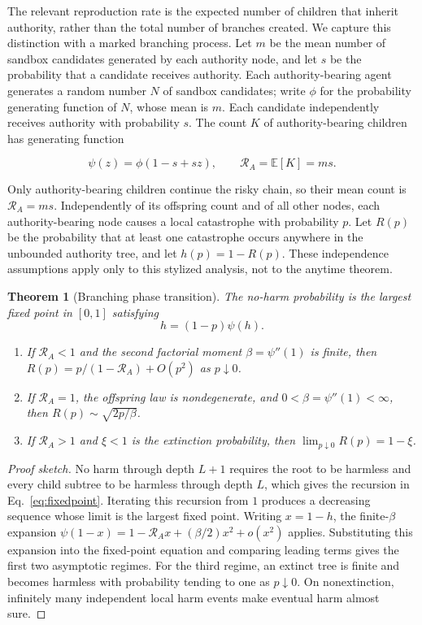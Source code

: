 \documentclass[sigconf,nonacm]{acmart}
\newtheorem{theorem}{Theorem}
\newcommand{\E}{\mathbb{E}}
\newcommand{\RA}{\mathcal{R}_{\!A}}
\begin{document}
The relevant reproduction rate is the expected number of children that inherit authority, rather
than the total number of branches created.  We capture this distinction with a marked branching process.  Let $m$ be
the mean number of sandbox candidates generated by each authority node, and let $s$ be the
probability that a candidate receives authority.  Each authority-bearing agent generates a
random number $N$ of sandbox candidates; write $\phi$ for the probability generating function of
$N$, whose mean is $m$.  Each candidate independently receives authority with probability $s$.
The count $K$ of authority-bearing children has generating function

\[
 \psi(z)=\phi(1-s+sz),\qquad \RA=\E[K]=ms.
\]

Only authority-bearing children continue the risky chain, so their mean count is
$\RA=ms$.  Independently of its offspring count and of all other nodes, each authority-bearing
node causes a local catastrophe with probability $p$.  Let $R(p)$ be the probability that at least one catastrophe occurs anywhere in
the unbounded authority tree, and let $h(p)=1-R(p)$.  These independence assumptions apply only to
this stylized analysis, not to the anytime theorem.

\begin{theorem}[Branching phase transition]
The no-harm probability is the largest fixed point in $[0,1]$ satisfying
\begin{equation}
 h=(1-p)\psi(h).
 \label{eq:fixedpoint}
\end{equation}
\begin{enumerate}
 \item If $\RA<1$ and the second factorial moment $\beta=\psi''(1)$ is finite, then
 $R(p)=p/(1-\RA)+O(p^2)$ as $p\downarrow0$.
 \item If $\RA=1$, the offspring law is nondegenerate, and
 $0<\beta=\psi''(1)<\infty$, then
 $R(p)\sim\sqrt{2p/\beta}$.
 \item If $\RA>1$ and $\xi<1$ is the extinction probability, then
 $\lim_{p\downarrow0}R(p)=1-\xi$.
\end{enumerate}
\end{theorem}

\begin{proof}[Proof sketch]
No harm through depth $L+1$ requires the root to be harmless and every child subtree to be
harmless through depth $L$, which gives the recursion in Eq.~\eqref{eq:fixedpoint}.  Iterating this
recursion from $1$ produces a decreasing sequence whose limit is the largest fixed point.  Writing $x=1-h$, the
finite-$\beta$ expansion
$\psi(1-x)=1-\RA x+(\beta/2)x^2+o(x^2)$ applies.  Substituting this expansion into the fixed-point
equation and comparing leading terms gives the first two asymptotic regimes.  For the third
regime, an extinct tree is finite and becomes harmless with probability tending to one as
$p\downarrow0$.  On nonextinction, infinitely many independent local harm events make eventual harm
almost sure.
\end{proof}
\end{document}
